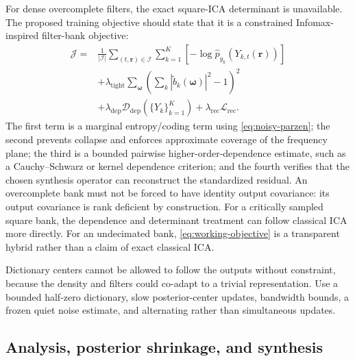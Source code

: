 \documentclass[11pt]{article}
\begin{document}
For dense overcomplete filters, the exact square-ICA determinant is unavailable.
The proposed training objective should state that it is a constrained
Infomax-inspired filter-bank objective:
\begin{align}
\mathcal J
={}&
\frac{1}{|\mathcal I|}
\sum_{(t,\bm r)\in\mathcal I}
\sum_{k=1}^{K}
\left[
-\log\widehat p_{y_k}
\left(Y_{k,t}(\bm r)\right)
\right]
\nonumber\\
&+
\lambda_{\mathrm{tight}}
\sum_{\bm\omega}
\left(
\sum_k|\widetilde b_k(\bm\omega)|^2-1
\right)^2
\nonumber\\
&+
\lambda_{\mathrm{dep}}
\mathcal D_{\mathrm{dep}}
\left(\{Y_k\}_{k=1}^{K}\right)
+
\lambda_{\mathrm{rec}}
\mathcal L_{\mathrm{rec}}.
\label{eq:working-objective}
\end{align}
The first term is a marginal entropy/coding term using
\cref{eq:noisy-parzen}; the second prevents collapse and enforces approximate
coverage of the frequency plane; the third is a bounded pairwise
higher-order-dependence estimate, such as a Cauchy--Schwarz or kernel
dependence criterion; and the fourth verifies that the chosen synthesis
operator can reconstruct the standardized residual. An overcomplete bank must
not be forced to have identity output covariance: its output covariance is
rank deficient by construction. For a critically sampled square bank, the
dependence and determinant treatment can follow classical ICA more directly.
For an undecimated bank, \cref{eq:working-objective} is a transparent hybrid
rather than a claim of exact classical ICA.

Dictionary centers cannot be allowed to follow the outputs without constraint,
because the density and filters could co-adapt to a trivial representation.
Use a bounded half-zero dictionary, slow posterior-center updates, bandwidth
bounds, a frozen quiet noise estimate, and alternating rather than simultaneous
updates.

\subsection{Analysis, posterior shrinkage, and synthesis}
\end{document}
